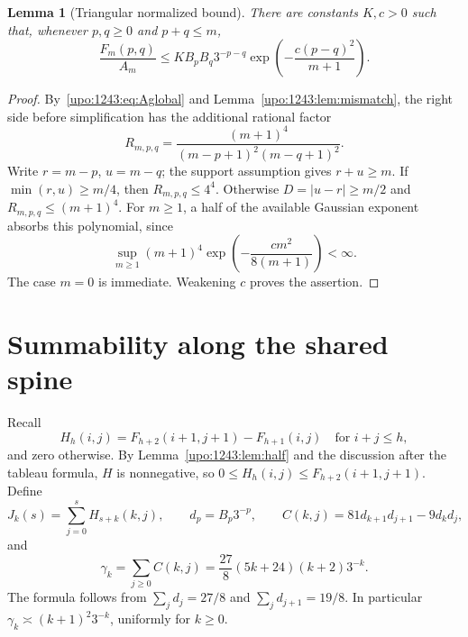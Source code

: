 \documentclass[11pt,letterpaper]{article}
\newtheorem{lemma}[theorem]{Lemma}
\theoremstyle{remark}\newtheorem{remark}[theorem]{Remark}
\numberwithin{equation}{section}
\begin{document}
\begin{lemma}[Triangular normalized bound]\label{upo:1243:lem:triangle}
There are constants $K,c>0$ such that, whenever $p,q\ge0$ and $p+q\le m$,
\begin{equation}\label{upo:1243:eq:triangle}
 \frac{F_m(p,q)}{A_m}
 \le K B_pB_q3^{-p-q}
 \exp\left(-\frac{c(p-q)^2}{m+1}\right).
\end{equation}
\end{lemma}
\begin{proof}
By~\eqref{upo:1243:eq:Aglobal} and Lemma~\ref{upo:1243:lem:mismatch}, the right side before
simplification has the additional rational factor
\[
 R_{m,p,q}=\frac{(m+1)^4}{(m-p+1)^2(m-q+1)^2}.
\]
Write $r=m-p$, $u=m-q$; the support assumption gives $r+u\ge m$.
If $\min(r,u)\ge m/4$, then $R_{m,p,q}\le4^4$.
Otherwise $D=|u-r|\ge m/2$ and $R_{m,p,q}\le(m+1)^4$.
For $m\ge1$, a half of the available Gaussian exponent absorbs this
polynomial, since
\[
 \sup_{m\ge1}(m+1)^4
 \exp\left(-\frac{c m^2}{8(m+1)}\right)<\infty.
\]
The case $m=0$ is immediate. Weakening $c$ proves the assertion.
\end{proof}


\section{Summability along the shared spine}\label{upo:1243:sec:endpoints}
Recall
\[
 H_h(i,j)=F_{h+2}(i+1,j+1)-F_{h+1}(i,j)
 \quad\text{for }i+j\le h,
\]
and zero otherwise. By Lemma~\ref{upo:1243:lem:half} and the discussion after the tableau formula, $H$ is nonnegative, so
$0\le H_h(i,j)\le F_{h+2}(i+1,j+1)$. Define
\[
 J_k(s)=\sum_{j=0}^s H_{s+k}(k,j),\qquad
 d_p=B_p3^{-p},\qquad
 C(k,j)=81d_{k+1}d_{j+1}-9d_kd_j,
\]
and
\begin{equation}\label{upo:1243:eq:gamma}
 \gamma_k=\sum_{j\ge0}C(k,j)
 =\frac{27}{8}(5k+24)(k+2)3^{-k}.
\end{equation}
The formula follows from $\sum_jd_j=27/8$ and
$\sum_jd_{j+1}=19/8$. In particular
$\gamma_k\asymp(k+1)^2 3^{-k}$, uniformly for $k\ge0$.
\end{document}
